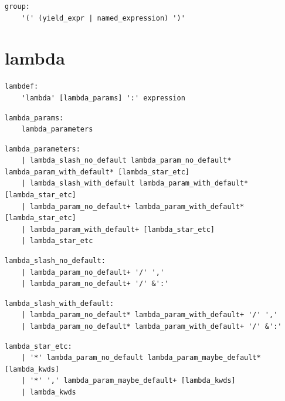 \noindent\textbf{\texttt{}}\par
\begin{lstlisting}
group:
    '(' (yield_expr | named_expression) ')'
\end{lstlisting}

\section{lambda}

\noindent\textbf{\texttt{}}\par
\begin{lstlisting}
lambdef:
    'lambda' [lambda_params] ':' expression
\end{lstlisting}

\noindent\textbf{\texttt{}}\par
\begin{lstlisting}
lambda_params:
    lambda_parameters
\end{lstlisting}

\noindent\textbf{\texttt{}}\par
\begin{lstlisting}
lambda_parameters:
    | lambda_slash_no_default lambda_param_no_default* lambda_param_with_default* [lambda_star_etc]
    | lambda_slash_with_default lambda_param_with_default* [lambda_star_etc]
    | lambda_param_no_default+ lambda_param_with_default* [lambda_star_etc]
    | lambda_param_with_default+ [lambda_star_etc]
    | lambda_star_etc
\end{lstlisting}

\noindent\textbf{\texttt{}}\par
\begin{lstlisting}
lambda_slash_no_default:
    | lambda_param_no_default+ '/' ','
    | lambda_param_no_default+ '/' &':'
\end{lstlisting}

\noindent\textbf{\texttt{}}\par
\begin{lstlisting}
lambda_slash_with_default:
    | lambda_param_no_default* lambda_param_with_default+ '/' ','
    | lambda_param_no_default* lambda_param_with_default+ '/' &':'
\end{lstlisting}

\noindent\textbf{\texttt{}}\par
\begin{lstlisting}
lambda_star_etc:
    | '*' lambda_param_no_default lambda_param_maybe_default* [lambda_kwds]
    | '*' ',' lambda_param_maybe_default+ [lambda_kwds]
    | lambda_kwds
\end{lstlisting}

